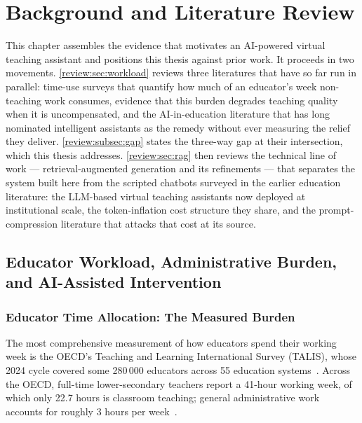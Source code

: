 \chapter{Background and Literature Review}
\label{ch:review}
\vspace{2em}

This chapter assembles the evidence that motivates an AI-powered virtual
teaching assistant and positions this thesis against prior work. It proceeds
in two movements. \autoref{review:sec:workload} reviews three literatures that
have so far run in parallel: time-use surveys that quantify how much of an
educator's week non-teaching work consumes, evidence that this
burden degrades teaching quality when it is uncompensated, and the
AI-in-education literature that has long nominated intelligent assistants as
the remedy without ever measuring the relief they deliver.
\autoref{review:subsec:gap} states the three-way gap at their intersection,
which this thesis addresses. \autoref{review:sec:rag} then reviews the
technical line of work --- retrieval-augmented generation and its refinements
--- that separates the system built here from the scripted chatbots surveyed
in the earlier education literature: the LLM-based virtual teaching
assistants now deployed at institutional scale, the token-inflation cost
structure they share, and the prompt-compression literature that attacks that
cost at its source.

\section{Educator Workload, Administrative Burden, and AI-Assisted
         Intervention}
\label{review:sec:workload}

\subsection{Educator Time Allocation: The Measured Burden}
\label{review:subsec:burden}

The most comprehensive measurement of how educators spend their working week
is the OECD's Teaching and Learning International Survey (TALIS), whose 2024
cycle covered some 280\,000 educators across 55 education
systems~\cite{oecd25:Talis}. Across the OECD, full-time lower-secondary
teachers report a 41-hour working week, of which only 22.7 hours is classroom
teaching; general administrative work accounts for roughly 3 hours per
week~\cite{oecd25:Talis}.


